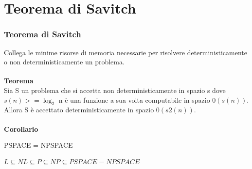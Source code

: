 \chapter{Teorema di Savitch} \label{ch:capitolo18}
\subsection{Teorema di Savitch}
Collega le minime risorse di memoria necessarie per risolvere deterministicamente o non deterministicamente un problema.\\\\
\textbf{Teorema}\\
Sia S un problema che si accetta non deterministicamente in spazio s dove $s(n) >= \log_2$ n è una funzione a sua volta computabile in spazio $0(s(n))$. Allora S è accettato deterministicamente in spazio $0(s2(n)).$\\\\
\textbf{Corollario}\\
\begin{center}
    PSPACE = NPSPACE
\end{center}
\begin{center}
    $L \subseteq NL \subseteq P \subseteq NP \subseteq PSPACE = NPSPACE$
\end{center}

